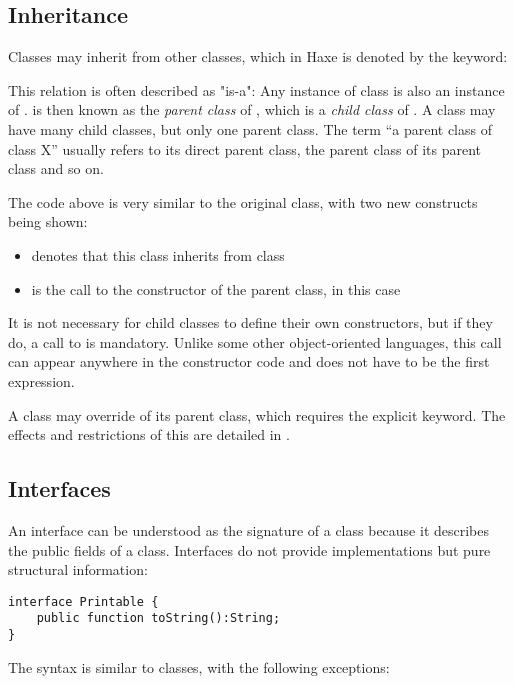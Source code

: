 \subsection{Inheritance}
\label{types-class-inheritance}

Classes may inherit from other classes, which in Haxe is denoted by the  keyword:

This relation is often described as "is-a": Any instance of class  is also an instance of .  is then known as the \emph{parent class} of , which is a \emph{child class} of . A class may have many child classes, but only one parent class. The term ``a parent class of class X'' usually refers to its direct parent class, the parent class of its parent class and so on.

The code above is very similar to the original  class, with two new constructs being shown:
\begin{itemize}
 \item {} denotes that this class inherits from class 
 \item {} is the call to the constructor of the parent class, in this case 
\end{itemize}
It is not necessary for child classes to define their own constructors, but if they do, a call to  is mandatory. Unlike some other object-oriented languages, this call can appear anywhere in the constructor code and does not have to be the first expression.

A class may override  of its parent class, which requires the explicit  keyword. The effects and restrictions of this are detailed in .


\subsection{Interfaces}
\label{types-interfaces}

An interface can be understood as the signature of a class because it describes the public fields of a class. Interfaces do not provide implementations but pure structural information:

\begin{lstlisting}
interface Printable {
	public function toString():String;
}
\end{lstlisting}
The syntax is similar to classes, with the following exceptions:

